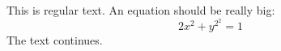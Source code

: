 \documentclass[12pt]{article}
\begin{document}
\noindent
This is regular text. An equation should be really big:
\[
    2x^2 + y^{2^2} = 1
\]
The text continues.
\end{document}
